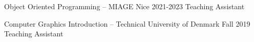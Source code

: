 

\begin{cventries}

  \cventry
    {Object Oriented Programming -- MIAGE Nice} %
    {2021-2023} %
    {Teaching Assistant} %

  \cventry
  {Computer Graphics Introduction -- Technical University of Denmark} %
    {Fall 2019} %
    {Teaching Assistant} %

\end{cventries}
